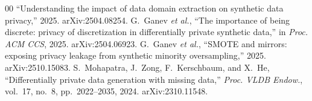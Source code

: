 \documentclass[conference]{IEEEtran}
\begin{document}
\begin{thebibliography}{00}
``Understanding the impact of data domain extraction on synthetic data privacy,'' 2025.
arXiv:2504.08254.
 G.~Ganev \emph{et al.}, ``The importance of being discrete: privacy of
discretization in differentially private synthetic data,'' in \emph{Proc. ACM CCS}, 2025.
arXiv:2504.06923.
 G.~Ganev \emph{et al.}, ``SMOTE and mirrors: exposing privacy leakage from
synthetic minority oversampling,'' 2025. arXiv:2510.15083.
 S.~Mohapatra, J.~Zong, F.~Kerschbaum, and X.~He, ``Differentially private
data generation with missing data,'' \emph{Proc. VLDB Endow.}, vol.~17, no.~8, pp.~2022--2035, 2024.
arXiv:2310.11548.
\end{thebibliography}
\end{document}
